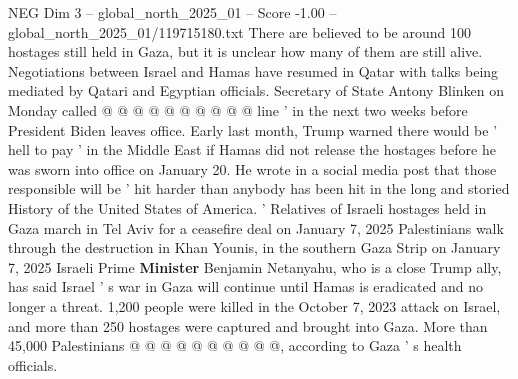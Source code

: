 \begin{textsample}{NEG Dim 3 – global\_north\_2025\_01 – Score -1.00 – global\_north\_2025\_01/119715180.txt}
There are believed to be around 100 hostages still held in Gaza, but it is unclear how many of them are still alive.
Negotiations between Israel and Hamas have resumed in Qatar with talks being mediated by Qatari and Egyptian officials.
Secretary of State Antony Blinken on Monday called @ @ @ @ @ @ @ @ @ @ line ' in the next two weeks before President Biden leaves office.
Early last month, Trump warned there would be ' hell to pay ' in the Middle East if Hamas did not release the hostages before he was sworn into office on January 20.
He wrote in a social media post that those responsible will be ' hit harder than anybody has been hit in the long and storied History of the United States of America. ' Relatives of Israeli hostages held in Gaza march in Tel Aviv for a ceasefire deal on January 7, 2025 Palestinians walk through the destruction in Khan Younis, in the southern Gaza Strip on January 7, 2025 Israeli Prime \textbf{Minister} Benjamin Netanyahu, who is a close Trump ally, has said Israel ' s war in Gaza will continue until Hamas is eradicated and no longer a threat. 1,200 people were killed in the October 7, 2023 attack on Israel, and more than 250 hostages were captured and brought into Gaza.
More than 45,000 Palestinians @ @ @ @ @ @ @ @ @ @, according to Gaza ' s health officials.

\end{textsample}

